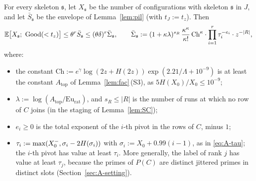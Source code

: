 \begin{proposition}\label{prop:cover}
For every skeleton $\mathfrak s$, let $X_{\mathfrak s}$ be the number of configurations with skeleton $\mathfrak s$ in
$J$, and let $\bar S_{\mathfrak s}$ be the envelope of Lemma~\ref{lem:pil} (with $t_J:=t_z$). Then
\begin{equation}\label{eq:coverbound}
\mathbb{E}\big[X_{\mathfrak s};\ \mathrm{Good}(<t_z)\big]\le\theta^r\bar S_{\mathfrak s}\le(\theta\delta)^r\bar\Sigma_{\mathfrak s},\qquad
\bar\Sigma_{\mathfrak s}:=(1+\kappa\lambda)^{s_R}\,\frac{\kappa^\kappa}{\kappa!}\,\mathrm{Ch}^{\kappa}\cdot
\prod_{i=1}^{r}\tau_i^{-e_i}\cdot z^{-|R|},
\end{equation}
where:
\begin{itemize}
\item the constant $\mathrm{Ch}:=e^{\gamma}\log(2z+H(2z))\exp(2.21/\Lambda+10^{-9})$ is at least the constant
  $A_{\mathrm{top}}$ of Lemma~\ref{lem:fac}\,(S3), as $5H(X_0)/X_0\le10^{-9}$;
\item $\lambda:=\log(A_{\mathrm{top}}/\mathrm{Eu}_{\mathrm{rat}})$, and $s_R\le|R|$ is the number of runs at which no row of
  $C$ joins (in the staging of Lemma~\ref{lem:SC});
\item $e_i\ge0$ is the total exponent of the $i$-th pivot in the rows of $C$, minus $1$;
\item $\tau_i:=\max(X_0^{-},\sigma_i-2H(\sigma_i))$ with $\sigma_i:=X_0+0.99(i-1)$, as in \eqref{eq:A-tau}; the $i$-th pivot
  has value at least $\tau_i$. More generally, the label of rank $j$ has value at least $\tau_j$, because the primes of
  $P(C)$ are distinct jittered primes in distinct slots (Section~\ref{sec:A-setting}).
\end{itemize}
\end{proposition}

